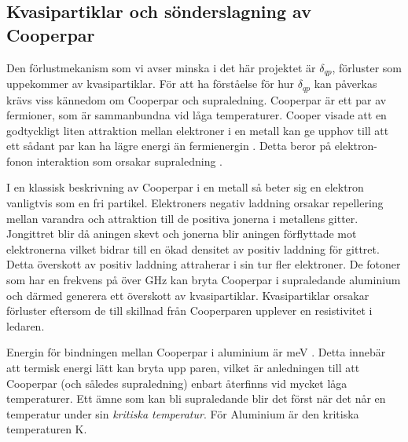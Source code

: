 \documentclass[main.tex]{subfiles}
\begin{document}
\subsection{Kvasipartiklar och sönderslagning av Cooperpar}
\label{sec:cooper}
Den förlustmekanism som vi avser minska i det här projektet är $\delta_{qp}$, förluster som uppekommer av kvasipartiklar. För att ha förståelse för hur $\delta_{qp}$ kan påverkas krävs viss kännedom om Cooperpar och supraledning. Cooperpar är ett par av fermioner, som är sammanbundna vid låga temperaturer. Cooper visade att en godtyckligt liten attraktion mellan elektroner i en metall kan ge upphov till att ett sådant par kan ha lägre energi än fermienergin \cite{Kittel2005}. Detta beror på elektron-fonon interaktion som orsakar supraledning \cite{Kittel2005}.

I en klassisk beskrivning av Cooperpar i en metall så beter sig en elektron vanligtvis som en fri partikel. Elektroners negativ laddning orsakar repellering mellan varandra och attraktion till de positiva jonerna i metallens gitter. Jongittret blir då aningen skevt och jonerna blir aningen förflyttade mot elektronerna vilket bidrar till en ökad densitet av positiv laddning för gittret. Detta överskott av positiv laddning attraherar i sin tur fler elektroner. De fotoner som har en frekvens på över \unit[88]{GHz} kan bryta Cooperpar i supraledande aluminium och därmed generera ett överskott av kvasipartiklar. Kvasipartiklar orsakar förluster eftersom de till skillnad från Cooperparen upplever en resistivitet i ledaren.

Energin för bindningen mellan Cooperpar i aluminium är \unit[0,39]{meV} \cite{Kittel2005}. Detta innebär att termisk energi lätt kan bryta upp paren, vilket är anledningen till att Cooperpar (och således supraledning) enbart återfinns vid mycket låga temperaturer. Ett ämne som kan bli supraledande blir det först när det når en temperatur under sin \emph{kritiska temperatur}. För Aluminium är den kritiska temperaturen \unit[1,2]{K}.




\end{document}
